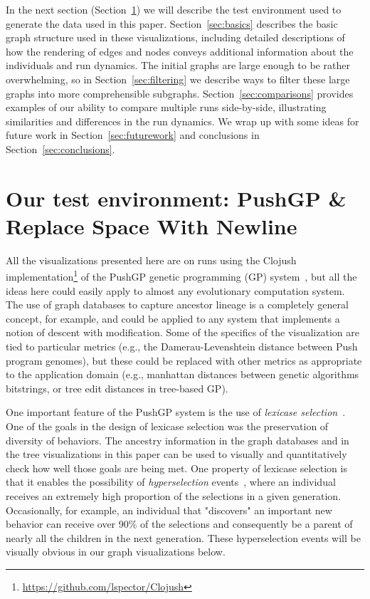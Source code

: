 \documentclass{sig-alternate}
\begin{document}
In the next section (Section~\ref{sec:testEnv}) we will describe the test
environment used to generate the data used in this paper. Section~\ref{sec:basics}
describes the basic graph structure used in these visualizations, including
detailed descriptions of how the rendering of edges and nodes conveys additional
information about the individuals and run dynamics. The initial graphs are large
enough to be rather overwhelming, so in Section~\ref{sec:filtering} we describe
ways to filter these large graphs into more comprehensible subgraphs. 
Section~\ref{sec:comparisons} provides examples of our ability to compare multiple
runs side-by-side, illustrating similarities and differences in the run dynamics.
We wrap up with some ideas for future work in Section~\ref{sec:futurework} and
conclusions in Section~\ref{sec:conclusions}.

\section{Our test environment: PushGP \& Replace Space With Newline}
\label{sec:testEnv}

All the visualizations presented here are on runs using the Clojush
implementation\footnote{\url{https://github.com/lspector/Clojush}} of the 
PushGP genetic programming (GP) system~\cite{spector:2002:GPEM, 1068292}, 
but all the ideas here
could easily apply to almost any evolutionary computation system. The use
of graph databases to capture ancestor lineage is a completely general
concept, for example, and could be applied to any system that implements a
notion of descent with modification. Some of the specifics of the visualization
are tied to particular metrics (e.g., the Damerau-Levenshtein distance
between Push program genomes), but these could be replaced with other
metrics as appropriate to the application domain (e.g., manhattan distances
between genetic algorithms bitstrings, or tree edit distances in
tree-based GP).

One important feature of the PushGP system is the use of \emph{lexicase
selection}~\cite{Helmuth:2015:ieeeTEC}. One of the goals in the design of
lexicase selection was the preservation of diversity of behaviors. The
ancestry information in the graph databases and in the tree visualizations 
in this paper can be used to visually and quantitatively check how
well those goals are being met. One property of lexicase selection is
that it enables the possibility of \emph{hyperselection} events~\cite{Helmuth:2016:GECCO},
where an individual receives an extremely high proportion of the selections
in a given generation. Occasionally, for example, an individual that
"discovers" an important new behavior can receive over 90\% of the selections
and consequently be a parent of nearly all the children in the next generation.
These hyperselection events will be visually obvious in our graph visualizations
below.
\end{document}
